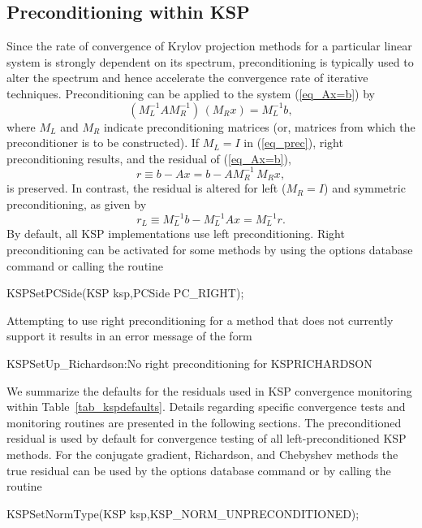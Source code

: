 \subsection{Preconditioning within KSP}
\label{sec_ksppc}

Since the rate of convergence of Krylov projection methods for a
particular linear system is strongly dependent on its spectrum,
preconditioning is typically used to alter the spectrum and hence
accelerate the convergence rate of iterative techniques.
Preconditioning can be applied to the system (\ref{eq_Ax=b}) by
\begin{equation}
   (M_L^{-1} A M_R^{-1}) \, (M_R x) = M_L^{-1} b,
\label{eq_prec}
\end{equation}
where $ M_L$ and $ M_R $ indicate preconditioning matrices (or, matrices
from which the preconditioner is to be constructed).  If $ M_L = I $
in (\ref{eq_prec}), right preconditioning results, and the
residual of (\ref{eq_Ax=b}),
  \[ r \equiv b - Ax = b - A M_R^{-1} \, M_R x, \]
is preserved.  In contrast, the residual is altered for left
($ M_R = I $) and symmetric preconditioning, as given by
  \[ r_L \equiv M_L^{-1} b - M_L^{-1} A x = M_L^{-1} r. \]
By default, all KSP implementations use left preconditioning.
Right preconditioning can be activated for some methods by
using the options database command  or
calling the routine 
\begin{tabbing}
  KSPSetPCSide(KSP ksp,PCSide PC\_RIGHT);
\end{tabbing}
Attempting to use right preconditioning for a method that
does not currently support it results in an error message of the form
\begin{tabbing}
   KSPSetUp\_Richardson:No right preconditioning for KSPRICHARDSON
\end{tabbing}

We summarize the defaults for the residuals used in KSP convergence
monitoring within Table~\ref{tab_kspdefaults}.  Details regarding
specific convergence tests and monitoring routines are presented in
the following sections.  The preconditioned residual is used by
default for convergence testing of all left-preconditioned KSP
methods. For the conjugate gradient, Richardson, and
Chebyshev methods the true residual can be used by
the options database command  or by calling the routine
\begin{tabbing}
  KSPSetNormType(KSP ksp,KSP\_NORM\_UNPRECONDITIONED);
\end{tabbing}

